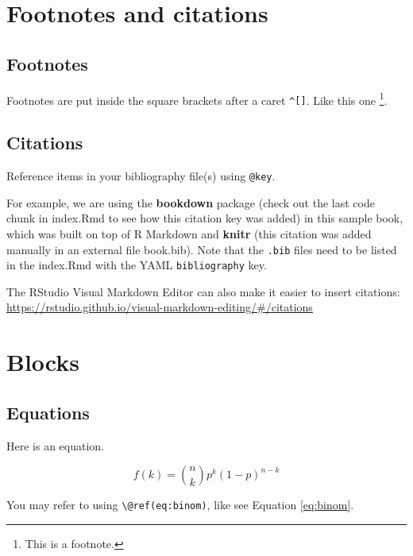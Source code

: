 \documentclass[
  12pt,
]{book}
\theoremstyle{definition}
\theoremstyle{definition}
\theoremstyle{definition}
\theoremstyle{definition}
\theoremstyle{remark}
\begin{document}
\hypertarget{footnotes-and-citations}{%
\chapter{Footnotes and citations}\label{footnotes-and-citations}}

\hypertarget{footnotes}{%
\section{Footnotes}\label{footnotes}}

Footnotes are put inside the square brackets after a caret \texttt{\^{}{[}{]}}. Like this one \footnote{This is a footnote.}.

\hypertarget{citations}{%
\section{Citations}\label{citations}}

Reference items in your bibliography file(s) using \texttt{@key}.

For example, we are using the \textbf{bookdown} package \citep{R-bookdown} (check out the last code chunk in index.Rmd to see how this citation key was added) in this sample book, which was built on top of R Markdown and \textbf{knitr} \citep{xie2015} (this citation was added manually in an external file book.bib).
Note that the \texttt{.bib} files need to be listed in the index.Rmd with the YAML \texttt{bibliography} key.

The RStudio Visual Markdown Editor can also make it easier to insert citations: \url{https://rstudio.github.io/visual-markdown-editing/\#/citations}

\hypertarget{blocks}{%
\chapter{Blocks}\label{blocks}}

\hypertarget{equations}{%
\section{Equations}\label{equations}}

Here is an equation.

\begin{equation} 
  f\left(k\right) = \binom{n}{k} p^k\left(1-p\right)^{n-k}
  \label{eq:binom}
\end{equation}

You may refer to using \texttt{\textbackslash{}@ref(eq:binom)}, like see Equation \eqref{eq:binom}.
\end{document}
